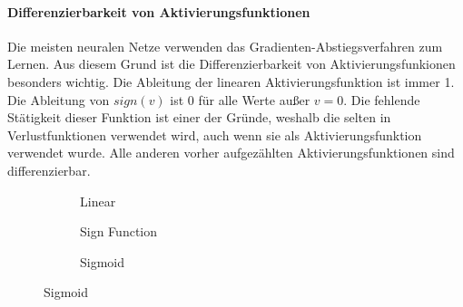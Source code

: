 \paragraph{Differenzierbarkeit von Aktivierungsfunktionen}
Die meisten neuralen Netze verwenden das Gradienten-Abstiegsverfahren zum Lernen. \cite{CA18} Aus diesem Grund ist die Differenzierbarkeit von Aktivierungsfunkionen besonders wichtig. Die Ableitung der linearen Aktivierungsfunktion ist immer 1.
Die Ableitung von $sign(v)$ ist 0 für alle Werte außer $v = 0$. Die fehlende Stätigkeit dieser Funktion ist einer der Gründe, weshalb die selten in Verlustfunktionen verwendet wird, auch wenn sie als Aktivierungsfunktion verwendet wurde. 
Alle anderen vorher aufgezählten Aktivierungsfunktionen sind differenzierbar. \cite{CA18}

\begin{figure}[htbp]
    \centering
    \begin{subfigure}{0.3\textwidth}
      \centering
      \caption{Linear}
      \label{fig:plot1}
    \end{subfigure}
    \hfill
    \begin{subfigure}{0.3\textwidth}
        \centering
        \caption{Sign Function}
        \label{fig:plot2}
      \end{subfigure}
    \hfill
    \begin{subfigure}{0.3\textwidth}
      \centering
      \caption{Sigmoid}
      \label{fig:plot3}
    \end{subfigure}
  

\end{figure}
